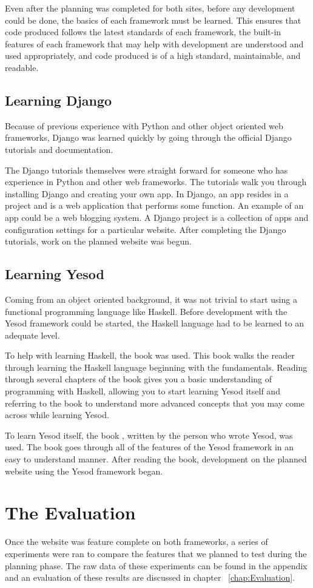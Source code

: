 Even after the planning was completed for both sites, before any development could
be done, the basics of each framework must be learned. This ensures that code
produced follows the latest standards of each framework, the built-in features
of each framework that may help with development are understood and used appropriately,
and code produced is of a high standard, maintainable, and readable.

\subsection{Learning Django}

Because of previous experience with Python and other object oriented web frameworks, 
Django was learned quickly by going through the official Django tutorials and 
documentation.

The Django tutorials themselves were straight forward for someone who has 
experience in Python and other web frameworks. The tutorials walk you through
installing Django and creating your own app. In Django, an app resides in a project
and is a web application that performs some function. An example of an app could be
a web blogging system. A Django project is a collection of apps and configuration
settings for a particular website. After completing the Django tutorials, work
on the planned website was begun. \parencite{djangoIntroDocs}

\subsection{Learning Yesod}

Coming from an object oriented background, it was not trivial to start using
a functional programming language like Haskell. Before development with the
Yesod framework could be started, the Haskell language had to be learned to
an adequate level.

To help with learning Haskell, the book  \parencite{haskellBook}
was used. This book walks the reader through learning the Haskell language beginning
with the fundamentals. Reading through several chapters of the book gives
you a basic understanding of programming with Haskell, allowing you to
start learning Yesod itself and referring to the book to understand more
advanced concepts that you may come across while learning Yesod.

To learn Yesod itself, the book  \parencite{yesodBook}, 
written by the person who wrote Yesod, was used. The book goes through all of the
features of the Yesod framework in an easy to understand manner. After
reading the book, development on the planned website using the Yesod
framework began.

\section{The Evaluation}

Once the website was feature complete on both frameworks, a series of experiments
were ran to compare the features that we planned to test during the planning phase.
The raw data of these experiments can be found in the appendix and an evaluation
of these results are discussed in chapter ~\ref{chap:Evaluation}.